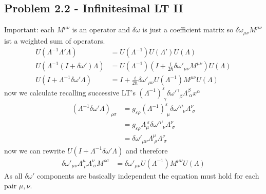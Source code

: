 \documentclass[../main.tex]{subfiles}
\begin{document}
\subsection{Problem 2.2 - Infinitesimal LT II}
Important: each $M^{\mu\nu}$ is an operator and $\delta\omega$ is just a coefficient matrix so $\delta\omega _{\mu\nu}M^{\mu\nu}$ ist a weighted sum of operators.
\begin{align}
U(\Lambda^{-1}\Lambda'\Lambda)&=U(\Lambda^{-1})U(\Lambda')U(\Lambda)\\
U(\Lambda^{-1}(I+\delta\omega')\Lambda)&=U(\Lambda^{-1})\left(I+\frac{i}{2\hbar}\delta\omega'_{\mu\nu}M^{\mu\nu}\right)U(\Lambda)\\
U(I+\Lambda^{-1}\delta\omega'\Lambda)&=I+\frac{i}{2\hbar}\delta\omega'_{\mu\nu}U(\Lambda^{-1})M^{\mu\nu}U(\Lambda)
\end{align}
now we calculate recalling successive LT's $(\Lambda^{-1})^{\varepsilon}_{\;\gamma}\delta\omega'^\gamma_{\;\;\beta}\Lambda^\beta_{\;\alpha}x^\alpha$
\begin{align}
(\Lambda^{-1}\delta\omega'\Lambda)_{\rho\sigma}
&=g_{\varepsilon\rho}(\Lambda^{-1})^{\varepsilon}_{\;\mu}\delta\omega'^\mu_{\;\;\nu}\Lambda^\nu_{\;\sigma}\\
&=g_{\varepsilon\rho}\Lambda^{\;\varepsilon}_{\mu}\delta\omega'^\mu_{\;\;\nu}\Lambda^\nu_{\;\sigma}\\
&=\delta\omega'_{\mu\nu}\Lambda^{\mu}_{\;\rho}\Lambda^\nu_{\;\sigma}
\end{align}
now we can rewrite $U(I+\Lambda^{-1}\delta\omega'\Lambda)$ and therefore
\begin{align}
\delta\omega'_{\mu\nu}\Lambda^{\mu}_{\;\rho}\Lambda^\nu_{\;\sigma}M^{\rho\sigma}&=\delta\omega'_{\mu\nu}U(\Lambda^{-1})M^{\mu\nu}U(\Lambda)
\end{align}
As all $\delta\omega'$ components are basically independent the equation must hold for each pair $\mu,\nu$.
\end{document}
